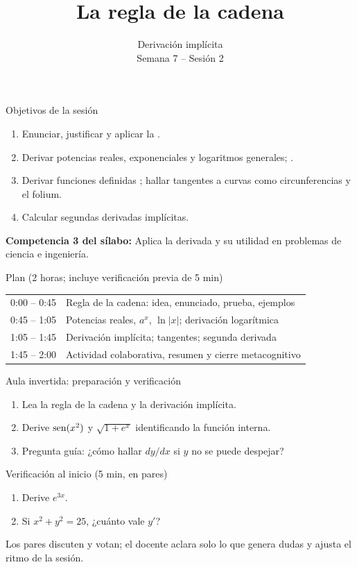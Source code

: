 \documentclass[10pt,aspectratio=169]{beamer}
\title[Regla de la cadena]{La regla de la cadena}
\subtitle{Derivación implícita\\[2pt]\small Semana 7 -- Sesión 2}
\begin{document}
\begin{frame}
  \titlepage
\end{frame}

\begin{frame}{Objetivos de la sesión}
  \begin{enumerate}
    \item Enunciar, justificar y aplicar la .
    \item Derivar potencias reales, exponenciales y logaritmos generales; .
    \item Derivar funciones definidas ; hallar tangentes a curvas como circunferencias y el folium.
    \item Calcular segundas derivadas implícitas.
  \end{enumerate}
  \vspace{1mm}
  {\small\textbf{Competencia 3 del sílabo:} Aplica la derivada y su utilidad en problemas de ciencia e ingeniería.}
  \begin{block}{Plan (2 horas; incluye verificación previa de 5 min)}
    \begin{tabular}{ll}
      0:00 -- 0:45 & Regla de la cadena: idea, enunciado, prueba, ejemplos\\
      0:45 -- 1:05 & Potencias reales, $a^x$, $\ln|x|$; derivación logarítmica\\
      1:05 -- 1:45 & Derivación implícita; tangentes; segunda derivada\\
      1:45 -- 2:00 & Actividad colaborativa, resumen y cierre metacognitivo
    \end{tabular}
  \end{block}
\end{frame}

\begin{frame}{Aula invertida: preparación y verificación}
  \small
  \begin{previa}
    \begin{enumerate}
      \item Lea la regla de la cadena y la derivación implícita.
      \item Derive $\operatorname{sen}(x^2)$ y $\sqrt{1+e^x}$ identificando la función interna.
      \item Pregunta guía: ¿cómo hallar $dy/dx$ si $y$ no se puede despejar?
    \end{enumerate}
  \end{previa}
  \begin{block}{Verificación al inicio (5 min, en pares)}
    \begin{enumerate}
      \item Derive $e^{3x}$.
      \item Si $x^2+y^2=25$, ¿cuánto vale $y'$?
    \end{enumerate}
    Los pares discuten y votan; el docente aclara solo lo que genera dudas y ajusta el ritmo de la sesión.
  \end{block}
\end{frame}
\end{document}
